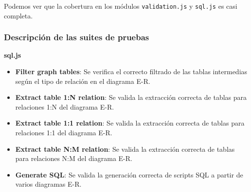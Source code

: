 Podemos ver que la cobertura en los módulos \texttt{validation.js} y \texttt{sql.js} es casi completa.



\subsubsection{Descripción de las suites de pruebas}

\textbf{sql.js}
\begin{itemize}
    \item \textbf{Filter graph tables}:
    Se verifica el correcto filtrado de las tablas intermedias según el tipo de relación en el diagrama E-R.

    \item \textbf{Extract table 1:N relation}:
    Se valida la extracción correcta de tablas para relaciones 1:N del diagrama E-R.

    \item \textbf{Extract table 1:1 relation}:
    Se valida la extracción correcta de tablas para relaciones 1:1 del diagrama E-R.

    \item \textbf{Extract table N:M relation}:
    Se valida la extracción correcta de tablas para relaciones N:M del diagrama E-R.

    \item \textbf{Generate SQL}:
    Se valida la generación correcta de scripts SQL a partir de varios diagramas E-R.
\end{itemize}

